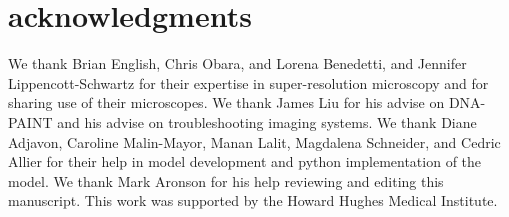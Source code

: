 \section{acknowledgments}
We thank Brian English, Chris Obara, and Lorena Benedetti, and Jennifer Lippencott-Schwartz for their expertise in
    super-resolution microscopy and for sharing use of their microscopes. 
    We thank James Liu for his advise on DNA-PAINT and his advise on troubleshooting imaging systems.
    We thank Diane Adjavon, Caroline Malin-Mayor, Manan Lalit, Magdalena Schneider, and Cedric Allier 
    for their help in model development and python implementation of the model. 
    We thank Mark Aronson for his help reviewing and editing this manuscript. 
    This work was supported by the Howard Hughes Medical Institute. 